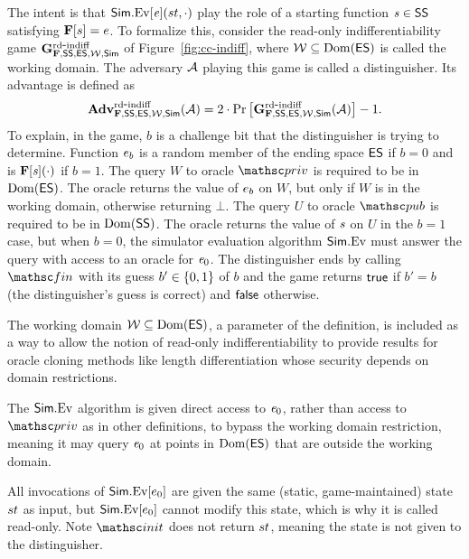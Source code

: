 The intent is that $\mathsf{Sim}.{\mathrm{Ev}}[\mathit{e}](st,\cdot)$  play the role of a starting function $\mathit{s} \in \mathsf{SS}$ satisfying $\mathbf{F}[s] = e$. To formalize this, consider the read-only indifferentiability game $\mathbf{G}^{\mathrm{rd\mbox{-}indiff}}_{\mathbf{F},\mathsf{SS},\mathsf{ES},{\cal W},\mathsf{Sim}}$ of Figure~\ref{fig:cc-indiff}, where ${\cal W}\subseteq\mathrm{Dom}(\mathsf{ES})$ is called the working domain. The adversary $\mathcal{A}$ playing this game is called a distinguisher. Its advantage is defined as
\[
\mathbf{Adv}^{\mathrm{rd\mbox{-}indiff}}_{\mathbf{F},\mathsf{SS},\mathsf{ES},{\cal W},\mathsf{Sim}}(\mathcal{A}) =
2 \cdot \Pr\left[ \mathbf{G}^{\mathrm{rd\mbox{-}indiff}}_{\mathbf{F},\mathsf{SS},\mathsf{ES},{\cal W},\mathsf{Sim}}(\mathcal{A})\right] - 1.
\]
To explain, in the game, $b$ is a challenge bit that the distinguisher is trying to determine.
Function $e_b$ is a random member of the ending space $\mathsf{ES}$ if $b=0$ and is $\mathbf{F}[\mathit{s}](\cdot)$ if $b=1$. The query $W$ to oracle $\priv$ is required to be in $\mathrm{Dom}(\mathsf{ES})$. The oracle returns the value of $e_b$ on $W$, but only if $W$ is in the working domain, otherwise returning $\bot$. The query $U$ to oracle $\pub$ is required to be in $\mathrm{Dom}(\mathsf{SS})$. The oracle returns the value of $\mathit{s}$ on $U$ in the $b=1$ case, but when $b=0$, the simulator evaluation algorithm $\mathsf{Sim}.{\mathrm{Ev}}$ must answer the query with access to an oracle for $\mathit{e}_0$. The distinguisher ends by calling $\Finalize$ with its guess $b'\in\{0,1\}$ of $b$ and the game returns $\mathsf{true}$ if $b'=b$ (the distinguisher's guess is correct) and $\mathsf{false}$ otherwise.

The working domain ${\cal W}\subseteq\mathrm{Dom}(\mathsf{ES})$, a parameter of the definition, is included as a way to allow the notion of read-only indifferentiability to provide results for oracle cloning methods like length differentiation whose security depends on domain restrictions.  

The $\mathsf{Sim}.{\mathrm{Ev}}$ algorithm is given direct access to $\mathit{e}_0$, rather than access to $\priv$ as in other definitions, to bypass the working domain restriction, meaning it may query $\mathit{e}_0$ at points in $\mathrm{Dom}(\mathsf{ES})$ that are outside the working domain.

All invocations of $\mathsf{Sim}.{\mathrm{Ev}}[e_0]$ are given the same (static, game-maintained) state $st$ as input, but $\mathsf{Sim}.{\mathrm{Ev}}[e_0]$ cannot modify this state, which is why it is called read-only. 
Note $\Initialize$ does not return $st$, meaning the state is not given to the distinguisher. 

